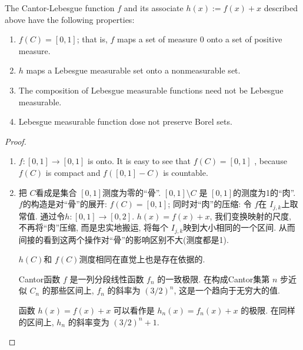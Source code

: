 \documentclass[../main.tex]{subfiles}
\begin{document}
\begin{corollary}{}{}
The Cantor-Lebesgue function $f$ and its associate $h(x) := f(x) + x$ described above have the following properties:
\begin{enumerate}
    \item[(i)] $f(C) = [0,1]$; that is, $f$ maps a set of measure 0 onto a set of positive measure.
    \item[(ii)] $h$ maps a Lebesgue measurable set onto a nonmeasurable set.
    \item[(iii)] The composition of Lebesgue measurable functions need not be Lebesgue measurable.
    \item[(iv)] Lebesgue measurable function dose not preserve Borel sets. 
\end{enumerate}
\end{corollary}
\begin{proof}
    \begin{enumerate}
        \item \(  f:\left[ 0,1 \right]\to \left[ 0,1 \right]    \) is onto. It is easy to see that \(  f\left( C \right)= \left[ 0,1 \right]    \) , because \(  f\left( C \right)   \) is compact and \(  f\left( \left[ 0,1 \right]-C  \right)   \) is countable.   
        \item 
        \begin{proofsketch}
            把 \(  C  \)看成是集合 \(  \left[ 0,1 \right]   \)测度为零的``骨''. \(  \left[ 0,1 \right]\setminus C   \) 是 \(  \left[ 0,1 \right]   \)的测度为1的``肉''. \(  f  \)的构造是对``骨''的展开: \(  f\left( C \right)= \left[ 0,1 \right]    \); 同时对``肉''的压缩: 令 \(  f  \)在 \(  I_{j,k}  \)上取常值. 通过令\(  h:\left[ 0,1 \right]\to \left[ 0,2 \right]    \).  \(  h\left( x \right)= f\left( x \right)+ x    \), 我们变换映射的尺度, 不再将``肉''压缩, 而是忠实地搬运, 将每个 \(  I_{j,k}  \)映到大小相同的一个区间.       从而间接的看到这两个操作对``骨''的影响区别不大(测度都是1).  
            
        \end{proofsketch}

        \begin{note}
            \(  h\left( C \right)    \)和 \(  f\left( C \right)   \)测度相同在直觉上也是存在依据的.  
            
            
Cantor函数 \(f\) 是一列分段线性函数 \(f_n\) 的一致极限. 在构成Cantor集第 \(n\) 步近似 \(C_n\) 的那些区间上, \(f_n\) 的斜率为 \((3/2)^n\), 这是一个趋向于无穷大的值.

函数 \(h(x) = f(x) + x\) 可以看作是 \(h_n(x) = f_n(x) + x\) 的极限. 在同样的区间上, \(h_n\) 的斜率变为 \((3/2)^n + 1\).


\end{note}
\end{enumerate}
\end{proof}
\end{document}
